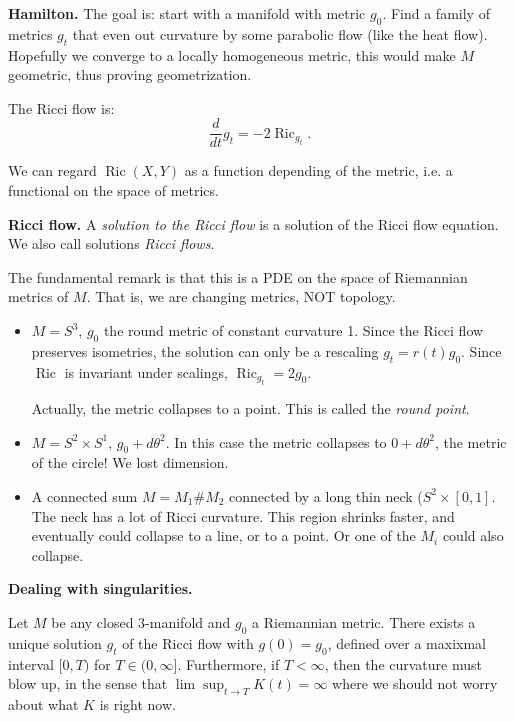 \medskip\noindent
{\bf Hamilton.} The goal is: start with a
manifold with metric $g_0$. Find a family of
metrics $g_t$ that even out curvature
by some parabolic flow (like the heat flow).
Hopefully we converge to a locally
homogeneous metric, this would make $M$
geometric, thus proving geometrization.

The Ricci flow is:
$$
\frac{d}{dt}g_t = -2
\operatorname{Ric}_{g_t}.
$$

\begin{remark}
\label{remark-ricci-metric}
We can regard $\operatorname{Ric}(X,Y)$
as a function depending of the metric, i.e.
a functional on the space of metrics.
\end{remark}

\medskip\noindent
{\bf Ricci flow.}
A {\it solution to the Ricci flow} is
a solution of the Ricci flow equation.
We also call solutions {\it Ricci flows}.

The fundamental remark is that this is a PDE
on the space of Riemannian metrics of $M$.
That is, we are changing metrics, NOT
topology.

\begin{example}
\label{example-ricci-flows}
\begin{itemize}
\item $M= S^3$, $g_0$ the round metric of
constant curvature 1. Since the Ricci flow
preserves isometries, the solution can only
be a rescaling $g_t=r(t)g_0$.
Since $\operatorname{Ric}$ is invariant
under scalings, $\operatorname{Ric}_{g_t}
=2 g_0$.

Actually, the metric collapses to a point.
This is called the {\it round point}.

\item  $M=S^2 \times S^1$, $g_0+d\theta^2$.
In this case the metric collapses to
$0+d\theta^2$, the metric of the circle! We
lost dimension.

\item A connected sum $M=M_1 \# M_2$
connected by a long thin neck ($S^2 \times
[0,1]$. The neck has a lot of Ricci
curvature. This region shrinks faster, and
eventually could collapse to a line, or to a
point. Or one of the $M_i$ could also
collapse.
\end{itemize}
\end{example}

\medskip\noindent
{\bf Dealing with singularities.}

\begin{theorem}[Hamilton, 1982]
\label{theorem-hamilton-1982}
Let $M$ be any closed 3-manifold and $g_0$
a Riemannian metric. There exists a unique
solution $g_t$ of the Ricci flow with
$g(0)=g_0$, defined over a maxixmal interval
$[0,T)$ for $T \in (0,\infty]$.
Furthermore, if $T< \infty$, then
the curvature must blow up,
in the sense that
$\lim \operatorname{sup}_{t \to T}K(t) 
= \infty$ where we should not worry about
what $K$ is right now.
\end{theorem}

